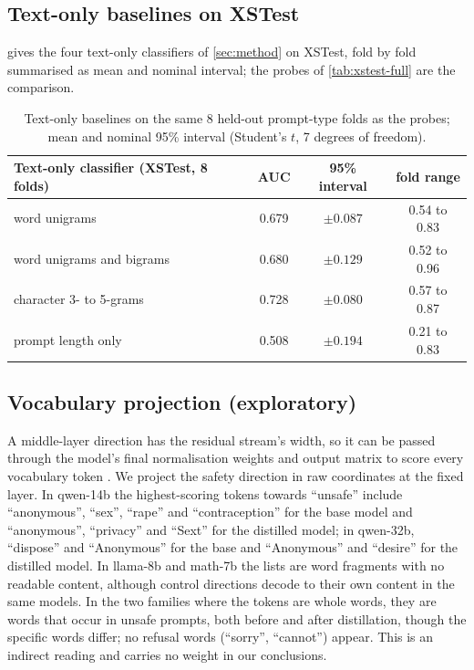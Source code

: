 \documentclass[10pt]{article}
\begin{document}
\subsection{Text-only baselines on XSTest}
\label{app:textbase}
 gives the four text-only classifiers of \cref{sec:method} on XSTest, fold by fold summarised as mean and nominal interval; the probes of \cref{tab:xstest-full} are the comparison.

\begin{table}[ht]
\centering
\small
\begin{tabular}{lccc}
\toprule
Text-only classifier (XSTest, 8 folds) & AUC & 95\% interval & fold range \\
\midrule
word unigrams & 0.679 & $\pm 0.087$ & 0.54 to 0.83 \\
word unigrams and bigrams & 0.680 & $\pm 0.129$ & 0.52 to 0.96 \\
character 3- to 5-grams & 0.728 & $\pm 0.080$ & 0.57 to 0.87 \\
prompt length only & 0.508 & $\pm 0.194$ & 0.21 to 0.83 \\
\bottomrule
\end{tabular}
\caption{Text-only baselines on the same 8 held-out prompt-type folds as the probes; mean and nominal 95\% interval (Student's $t$, 7 degrees of freedom).}
\label{tab:text}
\end{table}

\subsection{Vocabulary projection (exploratory)}
\label{app:vocab}
A middle-layer direction has the residual stream's width, so it can be passed through the model's final normalisation weights and output matrix to score every vocabulary token \citep[the ``logit lens'',][]{nostalgebraist2020}. We project the safety direction in raw coordinates at the fixed layer. In qwen-14b the highest-scoring tokens towards ``unsafe'' include ``anonymous'', ``sex'', ``rape'' and ``contraception'' for the base model and ``anonymous'', ``privacy'' and ``Sext'' for the distilled model; in qwen-32b, ``dispose'' and ``Anonymous'' for the base and ``Anonymous'' and ``desire'' for the distilled model. In llama-8b and math-7b the lists are word fragments with no readable content, although control directions decode to their own content in the same models. In the two families where the tokens are whole words, they are words that occur in unsafe prompts, both before and after distillation, though the specific words differ; no refusal words (``sorry'', ``cannot'') appear. This is an indirect reading and carries no weight in our conclusions.
\end{document}
